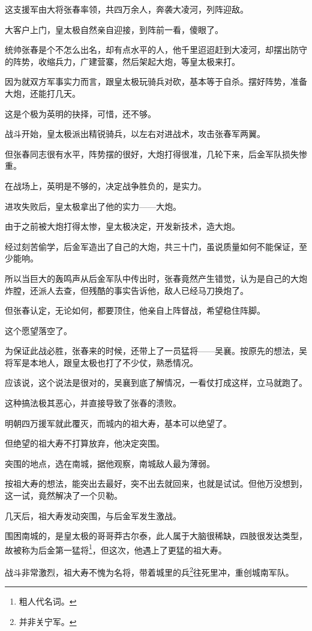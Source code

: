 \begin{multicols}{\theparacolNo}
这支援军由大将张春率领，共四万余人，奔袭大凌河，列阵迎敌。

大客户上门，皇太极自然亲自迎接，到阵前一看，傻眼了。

统帅张春是个不怎么出名，却有点水平的人，他千里迢迢赶到大凌河，却摆出防守的阵势，收缩兵力，广建营寨，然后架起大炮，等皇太极来打。

因为就双方军事实力而言，跟皇太极玩骑兵对砍，基本等于自杀。摆好阵势，准备大炮，还能打几天。

这是个极为英明的抉择，可惜，还不够。

战斗开始，皇太极派出精锐骑兵，以左右对进战术，攻击张春军两翼。

但张春同志很有水平，阵势摆的很好，大炮打得很准，几轮下来，后金军队损失惨重。

在战场上，英明是不够的，决定战争胜负的，是实力。

进攻失败后，皇太极拿出了他的实力——大炮。

由于之前被大炮打得太惨，皇太极决定，开发新技术，造大炮。

经过刻苦偷学，后金军造出了自己的大炮，共三十门，虽说质量如何不能保证，至少能响。

所以当巨大的轰鸣声从后金军队中传出时，张春竟然产生错觉，认为是自己的大炮炸膛，还派人去查，但残酷的事实告诉他，敌人已经马刀换炮了。

但张春认定，无论如何，都要顶住，他亲自上阵督战，希望稳住阵脚。

这个愿望落空了。

为保证此战必胜，张春来的时候，还带上了一员猛将——吴襄。按原先的想法，吴将军是本地人，跟皇太极也打了不少仗，熟悉情况。

应该说，这个说法是很对的，吴襄到底了解情况，一看仗打成这样，立马就跑了。

这种搞法极其恶心，并直接导致了张春的溃败。

明朝四万援军就此覆灭，而城内的祖大寿，基本可以绝望了。

但绝望的祖大寿不打算放弃，他决定突围。

突围的地点，选在南城，据他观察，南城敌人最为薄弱。

按祖大寿的想法，能突出去最好，突不出去就回来，也就是试试。但他万没想到，这一试，竟然解决了一个贝勒。

几天后，祖大寿发动突围，与后金军发生激战。

围困南城的，是皇太极的哥哥莽古尔泰，此人属于大脑很稀缺，四肢很发达类型，故被称为后金第一猛将\footnote{粗人代名词。}，但这次，他遇上了更猛的祖大寿。

战斗非常激烈，祖大寿不愧为名将，带着城里的兵\footnote{并非关宁军。}往死里冲，重创城南军队。


\end{multicols}
